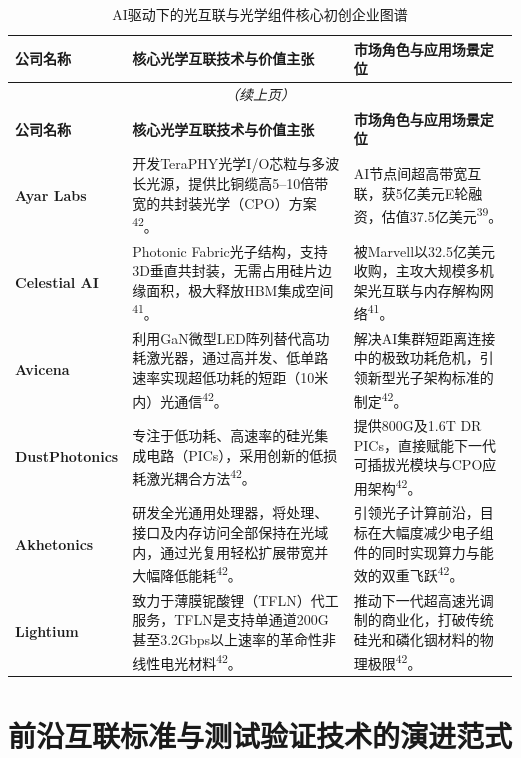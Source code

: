 \begin{longtable}{p{3.5cm} p{5cm} p{5cm}}
\caption{AI驱动下的光互联与光学组件核心初创企业图谱}
\label{tab:optical-startups} \\
\toprule
\textbf{公司名称} & \textbf{核心光学互联技术与价值主张} & \textbf{市场角色与应用场景定位} \\
\midrule
\endfirsthead
\multicolumn{3}{c}{\textit{（续上页）}} \\
\toprule
\textbf{公司名称} & \textbf{核心光学互联技术与价值主张} & \textbf{市场角色与应用场景定位} \\
\midrule
\endhead
\bottomrule
\endfoot
\bottomrule
\endlastfoot
\textbf{Ayar Labs}
  & 开发TeraPHY光学I/O芯粒与多波长光源，提供比铜缆高5--10倍带宽的共封装光学（CPO）方案\textsuperscript{42}。
  & AI节点间超高带宽互联，获5亿美元E轮融资，估值37.5亿美元\textsuperscript{39}。 \\

\textbf{Celestial AI}
  & Photonic Fabric光子结构，支持3D垂直共封装，无需占用硅片边缘面积，极大释放HBM集成空间\textsuperscript{41}。
  & 被Marvell以32.5亿美元收购，主攻大规模多机架光互联与内存解构网络\textsuperscript{41}。 \\

\textbf{Avicena}
  & 利用GaN微型LED阵列替代高功耗激光器，通过高并发、低单路速率实现超低功耗的短距（10米内）光通信\textsuperscript{42}。
  & 解决AI集群短距离连接中的极致功耗危机，引领新型光子架构标准的制定\textsuperscript{42}。 \\

\textbf{DustPhotonics}
  & 专注于低功耗、高速率的硅光集成电路（PICs），采用创新的低损耗激光耦合方法\textsuperscript{42}。
  & 提供800G及1.6T DR PICs，直接赋能下一代可插拔光模块与CPO应用架构\textsuperscript{42}。 \\

\textbf{Akhetonics}
  & 研发全光通用处理器，将处理、接口及内存访问全部保持在光域内，通过光复用轻松扩展带宽并大幅降低能耗\textsuperscript{42}。
  & 引领光子计算前沿，目标在大幅度减少电子组件的同时实现算力与能效的双重飞跃\textsuperscript{42}。 \\

\textbf{Lightium}
  & 致力于薄膜铌酸锂（TFLN）代工服务，TFLN是支持单通道200G甚至3.2Gbps以上速率的革命性非线性电光材料\textsuperscript{42}。
  & 推动下一代超高速光调制的商业化，打破传统硅光和磷化铟材料的物理极限\textsuperscript{42}。 \\
\end{longtable}

\section{前沿互联标准与测试验证技术的演进范式}

